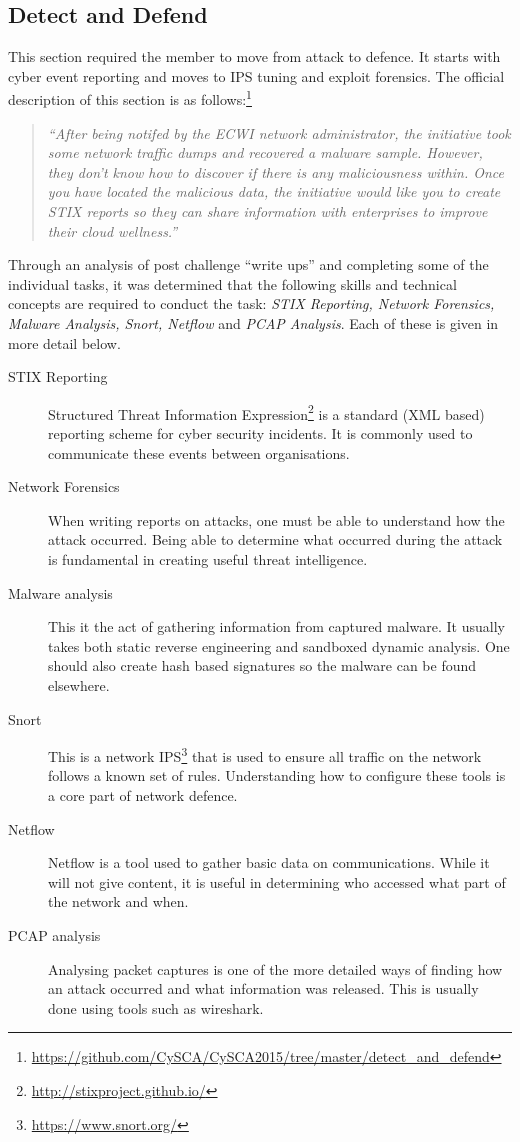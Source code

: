 \documentclass[twoside,a4paper,11pt]{report}
\begin{document}
		\subsection{Detect and Defend}
			This section required the member to move from attack to defence. 
			It starts with cyber event reporting and moves to IPS tuning and exploit forensics. 
			The official description of this section is as follows:\footnote{\url{https://github.com/CySCA/CySCA2015/tree/master/detect\_and\_defend}}
			\begin{quote}
				\textit{``After being notifed by the ECWI network administrator, 
				the initiative took some network traffic dumps and recovered a malware sample. 
				However, they don't know how to discover if there is any maliciousness within.
				Once you have located the malicious data, 
				the initiative would like you to create STIX reports so they can share information 
				with enterprises to improve their cloud wellness.''}
			\end{quote}
			
			Through an analysis of post challenge ``write ups'' and completing some of the individual tasks, 
			it was determined that the following skills and technical concepts are required to conduct the task: 
			\textit{STIX Reporting, Network Forensics, Malware Analysis, Snort, Netflow} and \textit{PCAP Analysis}.
			Each of these is given in more detail below. 
			\begin{description}
				\item[STIX Reporting]
					Structured Threat Information Expression\footnote{\url{http://stixproject.github.io/}} is a standard (XML based) reporting scheme for cyber security incidents. 
					It is commonly used to communicate these events between organisations.
				\item[Network Forensics]
					When writing reports on attacks, one must be able to understand how the attack occurred. 
					Being able to determine what occurred during the attack is fundamental in creating useful threat intelligence. 
				\item[Malware analysis]
					This it the act of gathering information from captured malware. 
					It usually takes both static reverse engineering and sandboxed dynamic analysis. 
					One should also create hash based signatures so the malware can be found elsewhere. 
				\item[Snort] 
					This is a network IPS\footnote{\url{https://www.snort.org/}} that is used to ensure all traffic on the network follows a known set of rules. 
					Understanding how to configure these tools is a core part of network defence. 
				\item[Netflow]
					Netflow is a tool used to gather basic data on communications. 
					While it will not give content, it is useful in determining who accessed what part of the network and when. 
				\item[PCAP analysis] 
					Analysing packet captures is one of the more detailed ways of finding how an attack occurred and what information was released. 
					This is usually done using tools such as wireshark. 
			\end{description}
\end{document}
